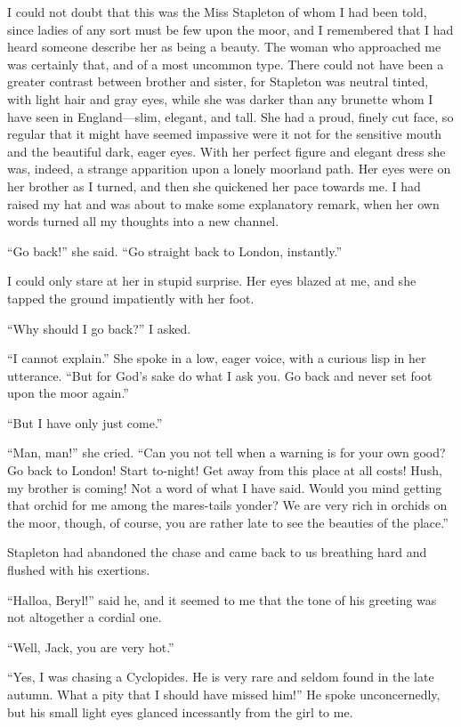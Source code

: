 \documentclass[paper=5.5in:8.5in,BCOR=7mm,twoside,DIV=calc,12pt,usegeometry,openany,chapterprefix,endperiod,headings=big]{scrbook} %
\begin{document}
I could not doubt that this was the Miss Stapleton of whom I had been told, since ladies of any sort must be few upon the moor, and I remembered that I had heard someone describe her as being a beauty. The woman who approached me was certainly that, and of a most uncommon type. There could not have been a greater contrast between brother and sister, for Stapleton was neutral tinted, with light hair and gray eyes, while she was darker than any brunette whom I have seen in England---slim, elegant, and tall. She had a proud, finely cut face, so regular that it might have seemed impassive were it not for the sensitive mouth and the beautiful dark, eager eyes. With her perfect figure and elegant dress she was, indeed, a strange apparition upon a lonely moorland path. Her eyes were on her brother as I turned, and then she quickened her pace towards me. I had raised my hat and was about to make some explanatory remark, when her own words turned all my thoughts into a new channel.

\enquote{Go back!} she said. \enquote{Go straight back to London, instantly.}

I could only stare at her in stupid surprise. Her eyes blazed at me, and she tapped the ground impatiently with her foot.

\enquote{Why should I go back?} I asked.

\enquote{I cannot explain.} She spoke in a low, eager voice, with a curious lisp in her utterance. \enquote{But for God's sake do what I ask you. Go back and never set foot upon the moor again.}

\enquote{But I have only just come.}

\enquote{Man, man!} she cried. \enquote{Can you not tell when a warning is for your own good? Go back to London! Start to-night! Get away from this place at all costs! Hush, my brother is coming! Not a word of what I have said. Would you mind getting that orchid for me among the mares-tails yonder? We are very rich in orchids on the moor, though, of course, you are rather late to see the beauties of the place.}

Stapleton had abandoned the chase and came back to us breathing hard and flushed with his exertions.

\enquote{Halloa, Beryl!} said he, and it seemed to me that the tone of his greeting was not altogether a cordial one.

\enquote{Well, Jack, you are very hot.}

\enquote{Yes, I was chasing a Cyclopides. He is very rare and seldom found in the late autumn. What a pity that I should have missed him!} He spoke unconcernedly, but his small light eyes glanced incessantly from the girl to me.
\end{document}
